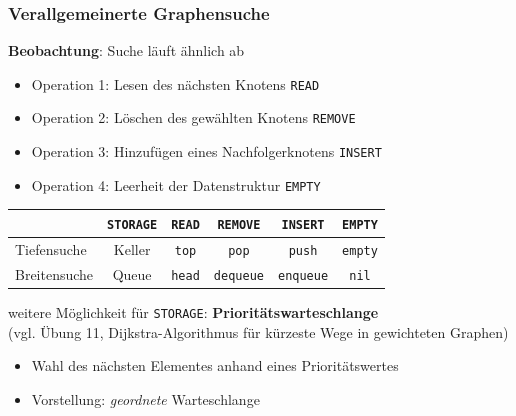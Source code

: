 \documentclass{beamer}
\begin{document}
\begin{frame} \frametitle{Verallgemeinerte Graphensuche}
	\small
	\textbf{Beobachtung}: Suche läuft ähnlich ab
	\begin{itemize}
		\item Operation 1: Lesen des nächsten Knotens \hfill \texttt{READ}
		\item Operation 2: Löschen des gewählten Knotens \hfill \texttt{REMOVE}
		\item Operation 3: Hinzufügen eines Nachfolgerknotens \hfill \texttt{INSERT}
		\item Operation 4: Leerheit der Datenstruktur \hfill \texttt{EMPTY}
	\end{itemize}

	\pause
	\begin{center}
		\begin{tabular}{l|ccccc}
			& \texttt{STORAGE} & \texttt{READ} & \texttt{REMOVE} & \texttt{INSERT} & \texttt{EMPTY} \\ \hline
			Tiefensuche & Keller & \texttt{top} & \texttt{pop} & \texttt{push} & \texttt{empty} \\
			Breitensuche & Queue & \texttt{head} & \texttt{dequeue} & \texttt{enqueue} & \texttt{nil} \\
		\end{tabular}
	\end{center}
	
	\pause
	weitere Möglichkeit für \texttt{STORAGE}: \textbf{Prioritätswarteschlange} \\
	{\scriptsize (vgl. Übung 11, Dijkstra-Algorithmus für kürzeste Wege in gewichteten Graphen)}
	\begin{itemize}
		\item Wahl des nächsten Elementes anhand eines Prioritätswertes
		\item Vorstellung: \textit{geordnete} Warteschlange
	\end{itemize}
\end{frame}
\end{document}
